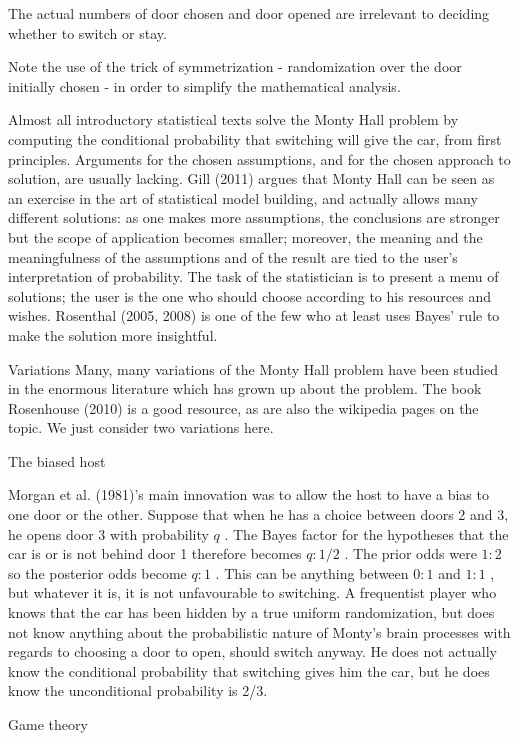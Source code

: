 The actual numbers of door chosen and door opened are irrelevant to deciding whether to switch or stay.

Note the use of the trick of symmetrization - randomization over the door initially chosen - in order to simplify the mathematical analysis.

Almost all introductory statistical texts solve the Monty Hall problem by computing the conditional probability that switching will give the car, from first principles. Arguments for the chosen assumptions, and for the chosen approach to solution, are usually lacking. Gill (2011) argues that Monty Hall can be seen as an exercise in the art of statistical model building, and actually allows many different solutions: as one makes more assumptions, the conclusions are stronger but the scope of application becomes smaller; moreover, the meaning and the meaningfulness of the assumptions and of the result are tied to the user's interpretation of probability. The task of the statistician is to present a menu of solutions; the user is the one who should choose according to his resources and wishes. Rosenthal (2005, 2008) is one of the few who at least uses Bayes' rule to make the solution more insightful.

Variations
Many, many variations of the Monty Hall problem have been studied in the enormous literature which has grown up about the problem. The book Rosenhouse (2010) is a good resource, as are also the wikipedia pages on the topic. We just consider two variations here.

The biased host

Morgan et al. (1981)'s main innovation was to allow the host to have a bias to one door or the other. Suppose that when he has a choice between doors 2 and 3, he opens door 3 with probability $ q$ . The Bayes factor for the hypotheses that the car is or is not behind door 1 therefore becomes $ q:1/2$ . The prior odds were $ 1:2$ so the posterior odds become $ q:1$ . This can be anything between $ 0:1$ and $ 1:1$ , but whatever it is, it is not unfavourable to switching. A frequentist player who knows that the car has been hidden by a true uniform randomization, but does not know anything about the probabilistic nature of Monty's brain processes with regards to choosing a door to open, should switch anyway. He does not actually know the conditional probability that switching gives him the car, but he does know the unconditional probability is 2/3.

Game theory

